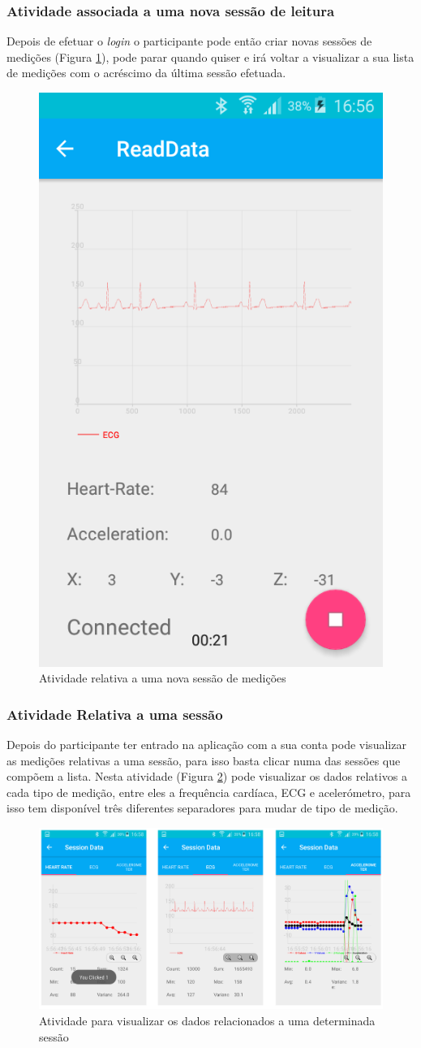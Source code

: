 \subsubsection{Atividade associada a uma nova sessão de leitura}
Depois de efetuar o \textit{login} o participante pode então criar novas sessões de medições (Figura \ref{f:onNewSession}), pode parar quando quiser e irá voltar a visualizar a sua lista de medições com o acréscimo da última sessão efetuada. 
\begin{figure}[H]
\centering
\includegraphics[height=0.3\textwidth]{imgs/reading.png}
\caption[Atividade relativa a uma nova sessão de medições]{Atividade relativa a uma nova sessão de medições}
\label{f:onNewSession}
\end{figure}

\subsubsection{Atividade Relativa a uma sessão}
Depois do participante ter entrado na aplicação com a sua conta pode visualizar as medições relativas a uma sessão, para isso basta clicar numa das sessões que compõem a lista. Nesta atividade (Figura \ref{f:read_data}) pode visualizar os dados relativos a cada tipo de medição, entre eles a frequência cardíaca, \gls{ECG} e acelerómetro, para isso tem disponível três diferentes separadores para mudar de tipo de medição. 
\begin{figure}[H]
\centering
\includegraphics[height=0.4\textwidth]{imgs/read_data.png}
\caption[Atividade para visualizar os dados relacionados a uma determinada sessão]{Atividade para visualizar os dados relacionados a uma determinada sessão}
\label{f:read_data}
\end{figure}

